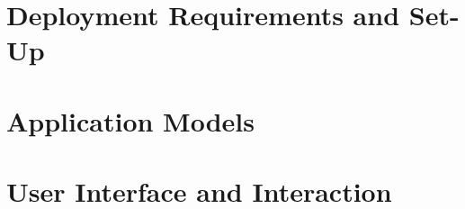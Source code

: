 \documentclass[ %
                author={Finn Alexander Wilkinson},
                supervisor={Dr. Andrew Calway},
                degree={MEng},
                title={\centering A Mixed Reality Aim Assistant for Pool and Snooker},
                subtitle={},
                type={Enterprise},
                year={2021} ]{dissertation}
\begin{document}





\section{Deployment Requirements and Set-Up}
\label{exec:deployment}

\section{Application Models}
\label{exec:modelling}

\section{User Interface and Interaction}
\label{exec:UI}
\end{document}

